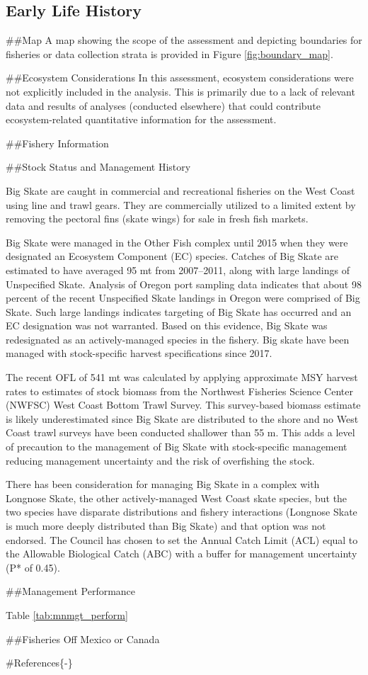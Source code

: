\documentclass[12pt,]{article}
\begin{document}
\hypertarget{early-life-history}{%
\subsection{Early Life History}\label{early-life-history}}

\#\#Map A map showing the scope of the assessment and depicting
boundaries for fisheries or data collection strata is provided in Figure
\ref{fig:boundary_map}.

\#\#Ecosystem Considerations In this assessment, ecosystem
considerations were not explicitly included in the analysis. This is
primarily due to a lack of relevant data and results of analyses
(conducted elsewhere) that could contribute ecosystem-related
quantitative information for the assessment.

\#\#Fishery Information

\#\#Stock Status and Management History

Big Skate are caught in commercial and recreational fisheries on the
West Coast using line and trawl gears. They are commercially utilized to
a limited extent by removing the pectoral fins (skate wings) for sale in
fresh fish markets.

Big Skate were managed in the Other Fish complex until 2015 when they
were designated an Ecosystem Component (EC) species. Catches of Big
Skate are estimated to have averaged 95 mt from 2007--2011, along with
large landings of Unspecified Skate. Analysis of Oregon port sampling
data indicates that about 98 percent of the recent Unspecified Skate
landings in Oregon were comprised of Big Skate. Such large landings
indicates targeting of Big Skate has occurred and an EC designation was
not warranted. Based on this evidence, Big Skate was redesignated as an
actively-managed species in the fishery. Big skate have been managed
with stock-specific harvest specifications since 2017.

The recent OFL of 541 mt was calculated by applying approximate MSY
harvest rates to estimates of stock biomass from the Northwest Fisheries
Science Center (NWFSC) West Coast Bottom Trawl Survey. This survey-based
biomass estimate is likely underestimated since Big Skate are
distributed to the shore and no West Coast trawl surveys have been
conducted shallower than 55 m. This adds a level of precaution to the
management of Big Skate with stock-specific management reducing
management uncertainty and the risk of overfishing the stock.

There has been consideration for managing Big Skate in a complex with
Longnose Skate, the other actively-managed West Coast skate species, but
the two species have disparate distributions and fishery interactions
(Longnose Skate is much more deeply distributed than Big Skate) and that
option was not endorsed. The Council has chosen to set the Annual Catch
Limit (ACL) equal to the Allowable Biological Catch (ABC) with a buffer
for management uncertainty (P* of 0.45).

\#\#Management Performance

Table \ref{tab:mnmgt_perform}

\#\#Fisheries Off Mexico or Canada

\newpage

\color{black}

\#References\{-\} \renewcommand{\thepage}{}
\end{document}
